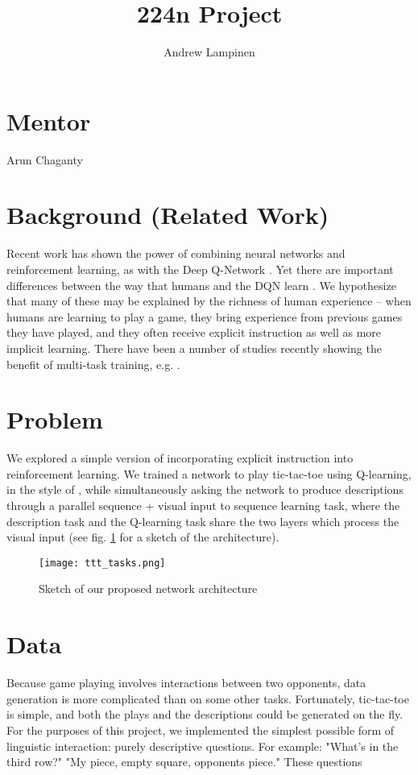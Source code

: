 \documentclass[11pt]{article}
\begin{document}
 
\setcounter{secnumdepth}{1}
\title{224n Project}
\author{Andrew Lampinen}
\date{}
\maketitle

\section{Mentor}
Arun Chaganty
\section{Background (Related Work)}
Recent work has shown the power of combining neural networks and reinforcement learning, as with the Deep Q-Network \cite{Mnih2015}. Yet there are important differences between the way that humans and the DQN learn \cite{Lake2016}. We hypothesize that many of these may be explained by the richness of human experience -- when humans are learning to play a game, they bring experience from previous games they have played, and they often receive explicit instruction as well as more implicit learning. There have been a number of studies recently showing the benefit of multi-task training, e.g. \cite{Luong2016}. 

\section{Problem}
We explored a simple version of incorporating explicit instruction into reinforcement learning. We trained a network to play tic-tac-toe using Q-learning, in the style of \cite{Mnih2015}, while simultaneously asking the network to produce descriptions through a parallel sequence + visual input to sequence learning task, where the description task and the Q-learning task share the two layers which process the visual input (see fig. \ref{network_diagram} for a sketch of the architecture).  
\begin{figure}
\centering
\texttt{[image: ttt\_tasks.png]}
\caption{Sketch of our proposed network architecture}
\label{network_diagram}
\end{figure}

\section{Data}
Because game playing involves interactions between two opponents, data generation is more complicated than on some other tasks. Fortunately, tic-tac-toe is simple, and both the plays and the descriptions could be generated on the fly. For the purposes of this project, we implemented the simplest possible form of linguistic interaction: purely descriptive questions. For example: "What's in the third row?" "My piece, empty square, opponents piece." These questions 
\end{document}
